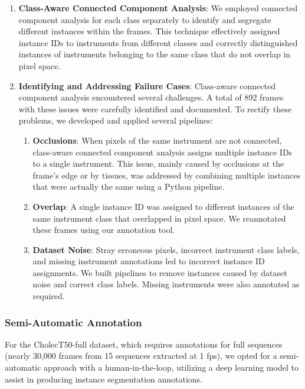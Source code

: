 \begin{enumerate}
    \item \textbf{Class-Aware Connected Component Analysis}: We employed connected component analysis for each class separately to identify and segregate different instances within the frames. This technique effectively assigned instance IDs to instruments from different classes and correctly distinguished instances of instruments belonging to the same class that do not overlap in pixel space.
    \item \textbf{Identifying and Addressing Failure Cases}: Class-aware connected component analysis encountered several challenges. A total of 892 frames with these issues were carefully identified and documented. To rectify these problems, we developed and applied several pipelines:
        \begin{enumerate}
            \item \textbf{Occlusions}: When pixels of the same instrument are not connected, class-aware connected component analysis assigns multiple instance IDs to a single instrument. This issue, mainly caused by occlusions at the frame's edge or by tissues, was addressed by combining multiple instances that were actually the same using a Python pipeline.
            \item \textbf{Overlap}: A single instance ID was assigned to different instances of the same instrument class that overlapped in pixel space. We reannotated these frames using our annotation tool.
            \item \textbf{Dataset Noise}: Stray erroneous pixels, incorrect instrument class labels, and missing instrument annotations led to incorrect instance ID assignments. We built pipelines to remove instances caused by dataset noise and correct class labels. Missing instruments were also annotated as required.
        \end{enumerate}
\end{enumerate}

\subsubsection*{Semi-Automatic Annotation}
For the CholecT50-full dataset, which requires annotations for full sequences (nearly 30,000 frames from 15 sequences extracted at 1 fps), we opted for a semi-automatic approach with a human-in-the-loop, utilizing a deep learning model to assist in producing instance segmentation annotations.


